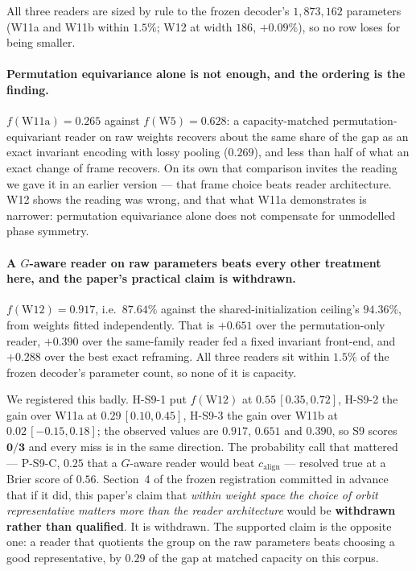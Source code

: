 \documentclass[10pt,letterpaper]{article}
\theoremstyle{definition}
\newcommand{\calign}{c_{\mathrm{align}}}
\begin{document}
All three readers are sized by rule to the frozen decoder's $1{,}873{,}162$ parameters (W11a and
W11b within $1.5\%$; W12 at width $186$, $+0.09\%$), so no row loses for being smaller.





\paragraph{Permutation equivariance alone is not enough, and the ordering is the finding.}
$f(\mathrm{W11a}) = 0.265$ against $f(\mathrm{W5}) = 0.628$: a capacity-matched
permutation-equivariant reader on raw weights recovers about the same share of the gap as an exact
invariant encoding with lossy pooling ($0.269$), and less than half of what an exact change of frame
recovers. On its own that comparison invites the reading we gave it in an earlier version --- that
frame choice beats reader architecture. W12 shows the reading was wrong, and that what W11a
demonstrates is narrower: permutation equivariance alone does not compensate for unmodelled phase
symmetry.

\paragraph{A $G$-aware reader on raw parameters beats every other treatment here, and the paper's
practical claim is withdrawn.} $f(\mathrm{W12}) = \mathbf{0.917}$, i.e.\ $87.64\%$ against the
shared-initialization ceiling's $94.36\%$, from weights fitted independently. That is $+0.651$ over
the permutation-only reader, $+0.390$ over the same-family reader fed a fixed invariant front-end,
and $+0.288$ over the best exact reframing. All three readers sit within $1.5\%$ of the frozen
decoder's parameter count, so none of it is capacity.

We registered this badly. H-S9-1 put $f(\mathrm{W12})$ at $0.55\,[0.35,0.72]$, H-S9-2 the gain over
W11a at $0.29\,[0.10,0.45]$, H-S9-3 the gain over W11b at $0.02\,[-0.15,0.18]$; the observed values
are $0.917$, $0.651$ and $0.390$, so S9 scores $\mathbf{0/3}$ and every miss is in the same
direction. The probability call that mattered --- P-S9-C, $0.25$ that a $G$-aware reader would beat
$\calign$ --- resolved true at a Brier score of $0.56$. Section~4 of the frozen registration
committed in advance that if it did, this paper's claim that \emph{within weight space the choice of
orbit representative matters more than the reader architecture} would be \textbf{withdrawn rather
than qualified}. It is withdrawn. The supported claim is the opposite one: a reader that quotients
the group on the raw parameters beats choosing a good representative, by $0.29$ of the gap at
matched capacity on this corpus.
\end{document}
